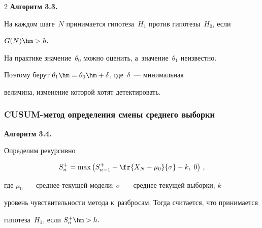 \begin{multicols}{2}
\textbf{Алгоритм 3.3.} %


На каждом шаге~$N$ принимается гипотеза~$H_1$ против гипотезы~$H_0$, если 


$G(N)\hm>h.$








\smallskip





На практике значение~$\theta_0$ можно оценить, а~значение~$\theta_1$ неизвестно. 


Поэтому  берут $\theta_1 \hm= \theta_0 \hm+ \delta$, где~$\delta$~--- минимальная 


величина, изменение которой хотят детектировать.





\subsubsection*{CUSUM-метод определения смены среднего выборки}










\noindent


\textbf{Алгоритм 3.4.} %


Определим рекурсивно 


\begin{equation*} 


S_n^+=\max\left (S_{n- 1}^+ + 


\fr{X_N - \mu_0}{\sigma} - k, \;0\right)\,, 


\end{equation*}


где $\mu_0$~--- среднее текущей модели; $\sigma$~--- среднее текущей выборки; $k$~--- 


уровень чувствительности метода к~разбросам. Тогда считается, что принимается 


гипотеза~$H_1$, если $S^+_n \hm> h.$





\smallskip






\end{multicols}
